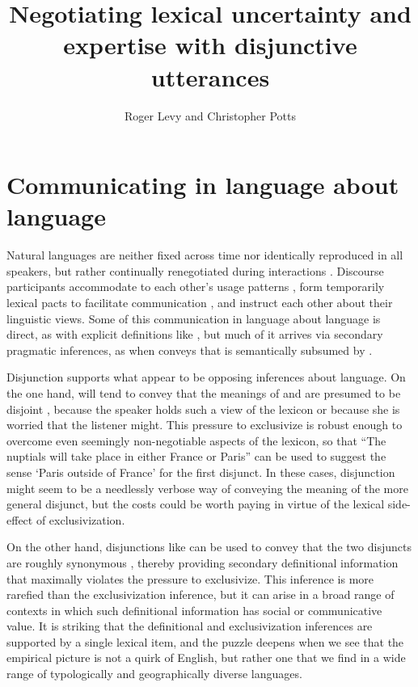 \documentclass{article}
\begin{document}

\title{Negotiating lexical uncertainty and expertise with disjunctive utterances}
\author{Roger Levy and Christopher Potts}
\maketitle


\section{Communicating in language about language}\label{sec:introduction}

Natural languages are neither fixed across time nor identically
reproduced in all speakers, but rather continually renegotiated during
interactions \citep{Clark97}. Discourse participants accommodate to
each other's usage patterns \citep{Giles:2008,DanLeePan:2012}, form
temporarily lexical pacts to facilitate communication
\citep{Clark:Wilkes-Gibbs:1986}, and instruct each other about their
linguistic views. Some of this communication in language about
language is direct, as with explicit definitions like
, but much of it arrives via
secondary pragmatic inferences, as when  conveys
that  is semantically subsumed by  \citep{Hearst92,SnowEtAl05}.

Disjunction supports what appear to be opposing inferences about
language. On the one hand,  will tend to convey that the
meanings of  and  are presumed to be disjoint
\citep{Hurford:1974}, because the speaker holds such a view of the
lexicon or because she is worried that the listener might. This
pressure to exclusivize is robust enough to overcome even seemingly
non-negotiable aspects of the lexicon, so that ``The nuptials will
take place in either France or Paris'' can be used to suggest the
sense `Paris outside of France' for the first disjunct. In these
cases, disjunction might seem to be a needlessly verbose way of
conveying the meaning of the more general disjunct, but the costs
could be worth paying in virtue of the lexical side-effect of
exclusivization.

On the other hand, disjunctions like 
can be used to convey that the two disjuncts are roughly synonymous
\citep{Horn89,Rohdenburg:1985}, thereby providing secondary
definitional information that maximally violates the pressure to
exclusivize. This inference is more rarefied than the exclusivization
inference, but it can arise in a broad range of contexts in which such
definitional information has social or communicative value. It is
striking that the definitional and exclusivization inferences are
supported by a single lexical item, and the puzzle deepens when we see
that the empirical picture is not a quirk of English, but rather one
that we find in a wide range of typologically and geographically
diverse languages.
\end{document}
